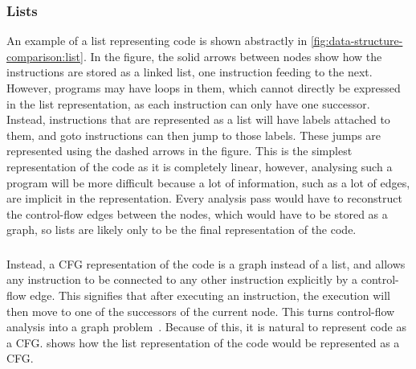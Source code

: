 \subsubsection{Lists}

An example of a list representing code is shown abstractly in
\cref{fig:data-structure-comparison:list}.  In the figure, the solid arrows
between nodes show how the instructions are stored as a linked list, one
instruction feeding to the next.  However, programs may have loops in them,
which cannot directly be expressed in the list representation, as each
instruction can only have one successor.  Instead, instructions that are
represented as a list will have labels attached to them, and goto instructions
can then jump to those labels.  These jumps are represented using the dashed
arrows in the figure.  This is the simplest representation of the code as it is
completely linear, however, analysing such a program will be more difficult
because a lot of information, such as a lot of edges, are implicit in the
representation.  Every analysis pass would have to reconstruct the control-flow
edges between the nodes, which would have to be stored as a graph, so lists are
likely only to be the final representation of the code.

\subsubsection{}

Instead, a \gls{CFG} representation of the code is a graph instead of a list,
and allows any instruction to be connected to any other instruction explicitly
by a control-flow edge.  This signifies that after executing an instruction, the
execution will then move to one of the successors of the current node.  This
turns control-flow analysis into a graph problem~\cite[]{allen70_cfa}.  Because
of this, it is natural to represent code as a \gls{CFG}.
 shows how the list representation of
the code would be represented as a \gls{CFG}.

\subsubsection{}

